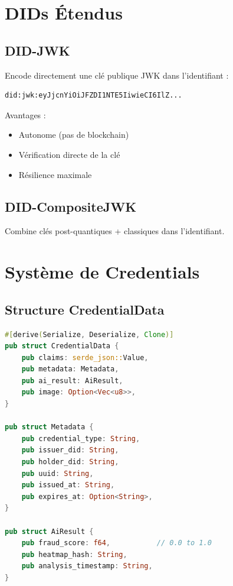 \documentclass[12pt,a4paper]{report}
\begin{document}
\section{DIDs Étendus}

\subsection{DID-JWK}

Encode directement une clé publique JWK dans l'identifiant :
\begin{lstlisting}
did:jwk:eyJjcnYiOiJFZDI1NTE5IiwieCI6IlZ...
\end{lstlisting}

Avantages :
\begin{itemize}
  \item Autonome (pas de blockchain)
  \item Vérification directe de la clé
  \item Résilience maximale
\end{itemize}

\subsection{DID-CompositeJWK}

Combine clés post-quantiques + classiques dans l'identifiant.

\section{Système de Credentials}

\subsection{Structure CredentialData}

\begin{lstlisting}[language=Rust]
#[derive(Serialize, Deserialize, Clone)]
pub struct CredentialData {
    pub claims: serde_json::Value,
    pub metadata: Metadata,
    pub ai_result: AiResult,
    pub image: Option<Vec<u8>>,
}

pub struct Metadata {
    pub credential_type: String,
    pub issuer_did: String,
    pub holder_did: String,
    pub uuid: String,
    pub issued_at: String,
    pub expires_at: Option<String>,
}

pub struct AiResult {
    pub fraud_score: f64,           // 0.0 to 1.0
    pub heatmap_hash: String,
    pub analysis_timestamp: String,
}
\end{lstlisting}
\end{document}
